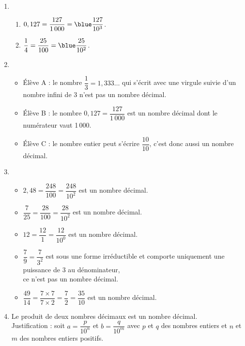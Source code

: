 \ \\ [-5mm]
   \begin{enumerate}
      \item
         \begin{enumerate}
            \item $0,127 =\dfrac{127}{1\,000} ={\blue \dfrac{127}{10^3}}$. \smallskip
            \item $\dfrac14 =\dfrac{25}{100} ={\blue \dfrac{25}{10^2}}$. \medskip
         \end{enumerate}
      \setcounter{enumi}{1}
      \item
         \begin{itemize}
            \item Élève A : le nombre {\blue$\dfrac13 =1,333\dots$} qui s'écrit avec une virgule suivie d'un nombre infini de 3 n'est pas un nombre décimal.
            \item Élève B : le nombre {\blue$0,127 =\dfrac{127}{1\,000}$} est un nombre décimal dont le numérateur vaut 1\,000.
            \item Élève C : le nombre entier {} peut s'écrire {\blue$\dfrac{10}{10}$}, c'est donc aussi un nombre décimal. \smallskip
         \end{itemize}
      \item
         \begin{itemize}
            \item $2,48 =\dfrac{248}{100} =\dfrac{248}{10^2}$ {\blue est un nombre décimal}. \smallskip
            \item $\dfrac{7}{25} =\dfrac{28}{100} =\dfrac{28}{10^2}$ {\blue est un nombre décimal}. \smallskip
            \item $12 =\dfrac{12}{1} =\dfrac{12}{10^0}$ {\blue est un nombre décimal}. \smallskip
            \item $\dfrac{7}{9} =\dfrac{7}{3^2}$ est sous une forme irréductible et comporte uniquement une puissance de 3 au dénominateur, \\ [1mm]
               {\blue ce n'est pas un nombre décimal}. \smallskip
            \item $\dfrac{49}{14} =\dfrac{7\times7}{7\times2} =\dfrac72 =\dfrac{35}{10}$ {\blue est un nombre décimal}. \medskip
         \end{itemize}
      \item {\blue Le produit de deux nombres décimaux est un nombre décimal}. \\
        Justification : soit $a =\dfrac{p}{10^n}$ et $b =\dfrac{q}{10^m}$ avec $p$ et $q$ des nombres entiers et $n$ et $m$ des nombres entiers positifs. \\ [1mm]

\end{enumerate}
